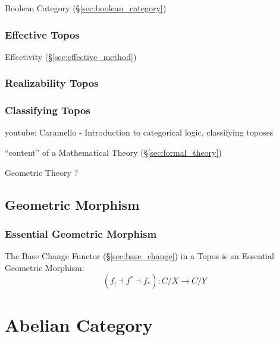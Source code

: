 Boolean Category (\S\ref{sec:boolean_category})



\subsubsection{Effective Topos}\label{sec:effective_topos}

Effectivity (\S\ref{sec:effective_method})



\subsubsection{Realizability Topos}\label{sec:realizability_topos}

\subsubsection{Classifying Topos}\label{sec:classifying_topos}

youtube: Caramello - Introduction to categorical logic, classifying
toposes

``content'' of a Mathematical Theory (\S\ref{sec:formal_theory})

Geometric Theory ?



\subsection{Geometric Morphism}\label{sec:geometric_morphism}

\subsubsection{Essential Geometric Morphism}
\label{sec:essential_geometric}

The Base Change Functor (\S\ref{sec:base_change}) in a Topos is an
Essential Geometric Morphism:
\[
  (f_! \dashv f^* \dashv f_*):C/X \rightarrow C/Y
\]



\section{Abelian Category}\label{sec:abelian_category}

